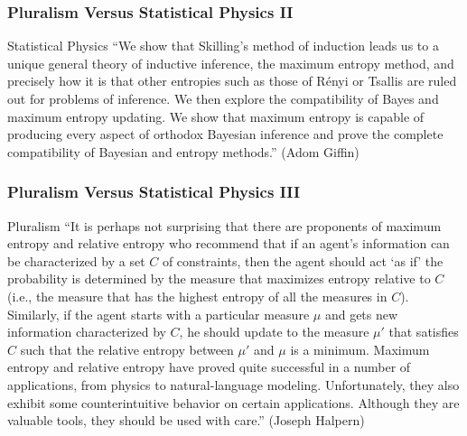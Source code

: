 \documentclass[xcolor=dvipsnames]{beamer}
\begin{document}
\begin{frame}
  \frametitle{Pluralism Versus Statistical Physics II}
  \begin{block}{Statistical Physics}
    ``We show that Skilling's method of induction leads us to a
    unique general theory of inductive inference, the maximum
    entropy method, and precisely how it is that other entropies
    such as those of R{\'e}nyi or Tsallis are ruled out for
    problems of inference. We then explore the compatibility of
    Bayes and maximum entropy updating. We show that maximum
    entropy is capable of producing every aspect of orthodox
    Bayesian inference and prove the complete compatibility of
    Bayesian and entropy methods.'' (Adom Giffin)
 \end{block}
\end{frame}

\begin{frame}
  \frametitle{Pluralism Versus Statistical Physics III}
\begin{block}{Pluralism}
  ``It is perhaps not surprising that there are proponents of maximum
  entropy and relative entropy who recommend that if an agent's
  information can be characterized by a set $C$ of constraints, then
  the agent should act `as if' the probability is determined by the
  measure that maximizes entropy relative to $C$ (i.e., the measure
  that has the highest entropy of all the measures in $C$). Similarly,
  if the agent starts with a particular measure $\mu$ and gets new
  information characterized by $C$, he should update to the measure
  $\mu'$ that satisfies $C$ such that the relative entropy between
  $\mu'$ and $\mu$ is a minimum. Maximum entropy and relative entropy
  have proved quite successful in a number of applications, from
  physics to natural-language modeling. Unfortunately, they also
  exhibit some counterintuitive behavior on certain applications.
  Although they are valuable tools, they should be used with care.''
  \linebreak (Joseph Halpern)
\end{block}
\end{frame}
\end{document}

